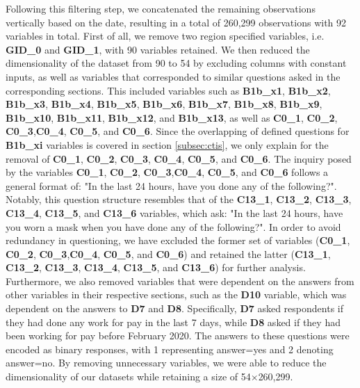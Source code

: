 Following this filtering step, we concatenated the remaining observations vertically based on the date, resulting in a total of 260,299 observations with 92 variables in total. First of all, we remove two region specified variables, i.e. \textbf{GID\_0} and \textbf{GID\_1}, with 90 variables retained. We then reduced the dimensionality of the dataset from 90 to 54 by excluding columns with constant inputs, as well as variables that corresponded to similar questions asked in the corresponding sections. This included variables such as \textbf{B1b\_x1}, \textbf{B1b\_x2}, \textbf{B1b\_x3}, \textbf{B1b\_x4}, \textbf{B1b\_x5}, \textbf{B1b\_x6}, \textbf{B1b\_x7}, \textbf{B1b\_x8}, \textbf{B1b\_x9}, \textbf{B1b\_x10}, \textbf{B1b\_x11}, \textbf{B1b\_x12}, and \textbf{B1b\_x13}, as well as \textbf{C0\_1}, \textbf{C0\_2}, \textbf{C0\_3},\textbf{C0\_4}, \textbf{C0\_5}, and \textbf{C0\_6}. Since the overlapping of defined questions for \textbf{B1b\_xi} variables is covered in section \ref{subsec:ctis}, we only explain for the removal of \textbf{C0\_1}, \textbf{C0\_2}, \textbf{C0\_3}, \textbf{C0\_4}, \textbf{C0\_5}, and \textbf{C0\_6}.  The inquiry posed by the variables \textbf{C0\_1}, \textbf{C0\_2}, \textbf{C0\_3},\textbf{C0\_4}, \textbf{C0\_5}, and \textbf{C0\_6} follows a general format of: "In the last 24 hours, have you done any of the following?". Notably, this question structure resembles that of the \textbf{C13\_1}, \textbf{C13\_2}, \textbf{C13\_3}, \textbf{C13\_4}, \textbf{C13\_5}, and \textbf{C13\_6} variables, which ask: "In the last 24 hours, have you worn a mask when you have done any of the following?". In order to avoid redundancy in questioning, we have excluded the former set of variables (\textbf{C0\_1}, \textbf{C0\_2}, \textbf{C0\_3},\textbf{C0\_4}, \textbf{C0\_5}, and \textbf{C0\_6}) and retained the latter (\textbf{C13\_1}, \textbf{C13\_2}, \textbf{C13\_3}, \textbf{C13\_4}, \textbf{C13\_5}, and \textbf{C13\_6}) for further analysis. Furthermore, we also removed variables that were dependent on the answers from other variables in their respective sections, such as the \textbf{D10} variable, which was dependent on the answers to \textbf{D7} and \textbf{D8}. Specifically, \textbf{D7} asked respondents if they had done any work for pay in the last 7 days, while \textbf{D8} asked if they had been working for pay before February 2020. The answers to these questions were encoded as binary responses, with 1 representing answer=yes and 2 denoting answer=no. By removing unnecessary variables, we were able to reduce the dimensionality of our datasets while retaining a size of 54$\times$260,299. 

